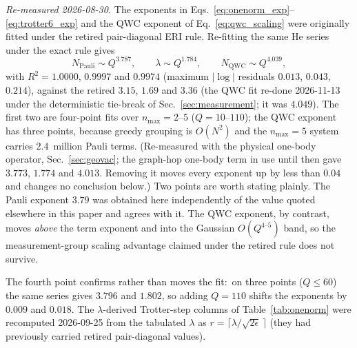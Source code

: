 \documentclass[aps,pra,twocolumn,superscriptaddress,longbibliography]{revtex4-2}
\newcommand{\gvq}[2]{#2}
\begin{document}
\emph{Re-measured 2026-08-30.}  The exponents in
Eqs.~\eqref{eq:onenorm_exp}--\eqref{eq:trotter6_exp} and the QWC exponent of
Eq.~\eqref{eq:qwc_scaling} were originally fitted under the retired
pair-diagonal ERI rule.  Re-fitting the same He series under the exact rule gives
\begin{equation}
  N_{\mathrm{Pauli}} \sim Q^{\gvq{exp_pauli_4pt}{3.787}},\qquad
  \lambda \sim Q^{\gvq{exp_lambda_4pt}{1.784}},\qquad
  N_{\mathrm{QWC}} \sim Q^{\gvq{exp_qwc_3pt}{4.039}},
  \label{eq:exact_exponents}
\end{equation}
with $R^2 = 1.0000$, $0.9997$ and $0.9974$ (maximum $|\log|$ residuals
$0.013$, $0.043$, $0.214$), against the retired $3.15$, $1.69$ and $3.36$
(the QWC fit re-done 2026-11-13 under the deterministic tie-break of
Sec.~\ref{sec:measurement}; it was $4.049$).
The first two are four-point fits over $n_{\max} = 2$--$5$
($Q = 10$--$110$); the QWC exponent has three points, because greedy
grouping is $O(N^2)$ and the $n_{\max}=5$ system carries $2.4$~million
Pauli terms.  (Re-measured with the physical one-body
operator, Sec.~\ref{sec:geovac}; the graph-hop one-body term in use until
then gave $3.773$, $1.774$ and $4.013$.  Removing it moves every exponent
up by less than $0.04$ and changes no conclusion below.)
Two points are worth stating plainly.  The Pauli exponent $3.79$ was
obtained here independently of the value quoted elsewhere in this paper and
agrees with it.  The QWC exponent, by contrast, moves \emph{above} the term
exponent and into the Gaussian $O(Q^{4\text{--}5})$ band, so the
measurement-group scaling advantage claimed under the retired rule does not
survive.

The fourth point confirms rather than moves the fit:\ on three points
($Q \le 60$) the same series gives $\gvq{exp_pauli_3pt}{3.796}$ and
$\gvq{exp_lambda_3pt}{1.802}$, so adding
$Q = 110$ shifts the exponents by $0.009$ and $0.018$.  The
$\lambda$-derived Trotter-step columns of Table~\ref{tab:onenorm} were
recomputed 2026-09-25 from the tabulated $\lambda$ as
$r = \lceil \lambda / \sqrt{2\epsilon}\,\rceil$ (they had previously
carried retired pair-diagonal values).
\end{document}
